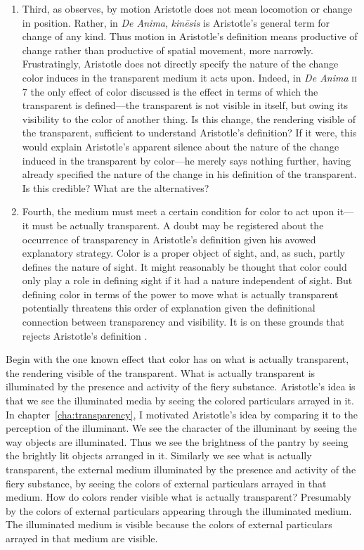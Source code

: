 \begin{enumerate}[(1)]
\item Third, as \citet[367]{Hicks:1907uq} observes, by motion Aristotle does not mean locomotion or change in position. Rather, in \emph{De Anima}, \emph{kinēsis} is Aristotle's general term for change of any kind. Thus motion in Aristotle's definition means productive of change rather than productive of spatial movement, more narrowly. Frustratingly, Aristotle does not directly specify the nature of the change color induces in the transparent medium it acts upon. Indeed, in \emph{De Anima} \textsc{ii} 7 the only effect of color discussed is the effect in terms of which the transparent is defined---the transparent is not visible in itself, but owing its visibility to the color of another thing. Is this change, the rendering visible of the transparent, sufficient to understand Aristotle's definition? If it were, this would explain Aristotle's apparent silence about the nature of the change induced in the transparent by color---he merely says nothing further, having already specified the nature of the change in his definition of the transparent. Is this credible? What are the alternatives?
\item Fourth, the medium must meet a certain condition for color to act upon it---it must be actually transparent. A doubt may be registered about the occurrence of transparency in Aristotle's definition given his avowed explanatory strategy. Color is a proper object of sight, and, as such, partly defines the nature of sight. It might reasonably be thought that color could only play a role in defining sight if it had a nature independent of sight. But defining color in terms of the power to move what is actually transparent potentially threatens this order of explanation given the definitional connection between transparency and visibility. It is on these grounds that \citet{Zabarella:1605kx} rejects Aristotle's definition \citep[see][for discussion]{Broackes:1999uq}.
\end{enumerate}

Begin with the one known effect that color has on what is actually transparent, the rendering visible of the transparent. What is actually transparent is illuminated by the presence and activity of the fiery substance. Aristotle's idea is that we see the illuminated media by seeing the colored particulars arrayed in it. In chapter~\ref{cha:transparency}, I motivated Aristotle's idea by comparing it to the perception of the illuminant. We see the character of the illuminant by seeing the way objects are illuminated. Thus we see the brightness of the pantry by seeing the brightly lit objects arranged in it. Similarly we see what is actually transparent, the external medium illuminated by the presence and activity of the fiery substance, by seeing the colors of external particulars arrayed in that medium. How do colors render visible what is actually transparent? Presumably by the colors of external particulars appearing through the illuminated medium. The illuminated medium is visible because the colors of external particulars arrayed in that medium are visible. 

